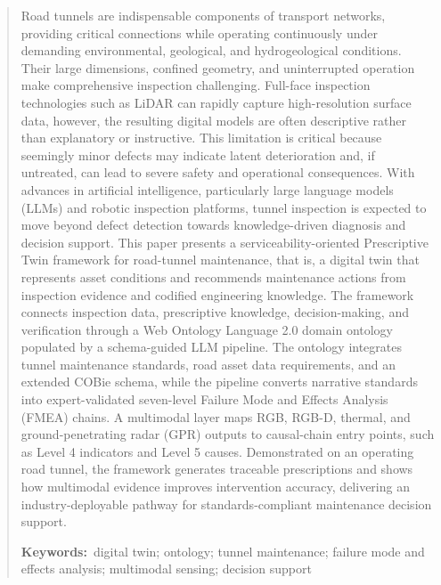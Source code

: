 \documentclass[11pt,a4paper]{article}
\begin{document}
\clearpage
\begin{abstract}
\noindent
Road tunnels are indispensable components of transport networks, providing critical connections while operating continuously under demanding environmental, geological, and hydrogeological conditions. Their large dimensions, confined geometry, and uninterrupted operation make comprehensive inspection challenging. Full-face inspection technologies such as LiDAR can rapidly capture high-resolution surface data, however, the resulting digital models are often descriptive rather than explanatory or instructive. This limitation is critical because seemingly minor defects may indicate latent deterioration and, if untreated, can lead to severe safety and operational consequences. With advances in artificial intelligence, particularly large language models (LLMs) and robotic inspection platforms, tunnel inspection is expected to move beyond defect detection towards knowledge-driven diagnosis and decision support. This paper presents a serviceability-oriented Prescriptive Twin framework for road-tunnel maintenance, that is, a digital twin that represents asset conditions and recommends maintenance actions from inspection evidence and codified engineering knowledge. The framework connects inspection data, prescriptive knowledge, decision-making, and verification through a Web Ontology Language 2.0 domain ontology populated by a schema-guided LLM pipeline. The ontology integrates tunnel maintenance standards, road asset data requirements, and an extended COBie schema, while the pipeline converts narrative standards into expert-validated seven-level Failure Mode and Effects Analysis (FMEA) chains. A multimodal layer maps RGB, RGB-D, thermal, and ground-penetrating radar (GPR) outputs to causal-chain entry points, such as Level 4 indicators and Level 5 causes. Demonstrated on an operating road tunnel, the framework generates traceable prescriptions and shows how multimodal evidence improves intervention accuracy, delivering an industry-deployable pathway for standards-compliant maintenance decision support.

\medskip\noindent
\textbf{Keywords:}~digital twin; ontology; tunnel maintenance; failure mode and effects analysis; multimodal sensing; decision support
\end{abstract}

\clearpage
\thispagestyle{empty}
\end{document}
